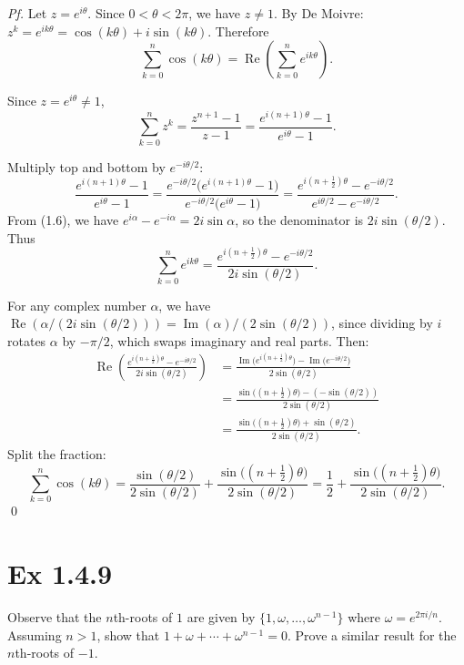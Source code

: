 \documentclass[a4paper]{article}
\begin{document}
\textit{Pf.} Let $z = e^{i\theta}$.  Since $0 < \theta < 2\pi$, we have $z \neq 1$.  By De Moivre: $z^k = e^{ik\theta} = \cos(k\theta) + i\sin(k\theta)$.  Therefore
\[
\sum_{k=0}^n \cos(k\theta) = \operatorname{Re}\!\left(\sum_{k=0}^n e^{ik\theta}\right).
\]

Since $z = e^{i\theta} \neq 1$,
\[
\sum_{k=0}^n z^k = \frac{z^{n+1} - 1}{z - 1} = \frac{e^{i(n+1)\theta} - 1}{e^{i\theta} - 1}.
\]

Multiply top and bottom by $e^{-i\theta/2}$:
\[
\frac{e^{i(n+1)\theta}-1}{e^{i\theta}-1}
= \frac{e^{-i\theta/2}\bigl(e^{i(n+1)\theta}-1\bigr)}{e^{-i\theta/2}\bigl(e^{i\theta}-1\bigr)}
= \frac{e^{i(n+\frac{1}{2})\theta} - e^{-i\theta/2}}{e^{i\theta/2} - e^{-i\theta/2}}.
\]
From (1.6), we have $e^{i\alpha} - e^{-i\alpha} = 2i\sin\alpha$, so the denominator is $2i\sin(\theta/2)$.  Thus
\[
\sum_{k=0}^n e^{ik\theta} = \frac{e^{i(n+\frac{1}{2})\theta} - e^{-i\theta/2}}{2i\sin(\theta/2)}.
\]

For any complex number $\alpha$, we have $\operatorname{Re}(\alpha/(2i\sin(\theta/2))) = \operatorname{Im}(\alpha)/(2\sin(\theta/2))$, since dividing by $i$ rotates $\alpha$ by $-\pi/2$, which swaps imaginary and real parts.  Then:
\begin{align*}
\operatorname{Re}\!\left(\frac{e^{i(n+\frac{1}{2})\theta} - e^{-i\theta/2}}{2i\sin(\theta/2)}\right)
&= \frac{\operatorname{Im}\!\bigl(e^{i(n+\frac{1}{2})\theta}\bigr) - \operatorname{Im}\!\bigl(e^{-i\theta/2}\bigr)}{2\sin(\theta/2)} \\
&= \frac{\sin\bigl((n+\tfrac{1}{2})\theta\bigr) - (-\sin(\theta/2))}{2\sin(\theta/2)} \\
&= \frac{\sin\bigl((n+\tfrac{1}{2})\theta\bigr) + \sin(\theta/2)}{2\sin(\theta/2)}.
\end{align*}
Split the fraction:
\[
\sum_{k=0}^n \cos(k\theta) = \frac{\sin(\theta/2)}{2\sin(\theta/2)} + \frac{\sin\bigl((n+\tfrac{1}{2})\theta\bigr)}{2\sin(\theta/2)} = \frac{1}{2} + \frac{\sin\bigl((n+\tfrac{1}{2})\theta\bigr)}{2\sin(\theta/2)}.
\]
\qed

\newpage
\section*{Ex 1.4.9}

\begin{tcolorbox}[colback=gray!10, colframe=black, boxrule=0.5pt, arc=2mm]
Observe that the $n$th-roots of $1$ are given by $\{1, \omega, \ldots, \omega^{n-1}\}$ where $\omega = e^{2\pi i/n}$. Assuming $n > 1$, show that $1 + \omega + \cdots + \omega^{n-1} = 0$. Prove a similar result for the $n$th-roots of $-1$.
\end{tcolorbox}
\end{document}
